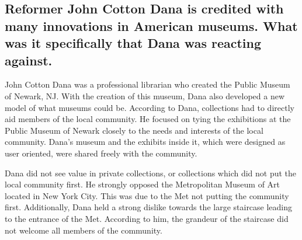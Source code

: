 \documentclass[11pt]{article}
\begin{document}
\begin{singlespacing}
\subsection*{Reformer John Cotton Dana is credited with many innovations in American museums. What was it specifically that Dana was reacting against.}
\end{singlespacing}

John Cotton Dana was a professional librarian who created the Public Museum of Newark, NJ. With the creation of this museum, Dana also developed a new model of what museums could be. According to Dana, collections had to directly aid members of the local community. He focused on tying the exhibitions at the Public Museum of Newark closely to the needs and interests of the local community. Dana's museum and the exhibits inside it, which were designed as user oriented, were shared freely with the community.

Dana did not see value in private collections, or collections which did not put the local community first. He strongly opposed the Metropolitan Museum of Art located in New York City. This was due to the Met not putting the community first. Additionally, Dana held a strong dislike towards the large staircase leading to the entrance of the Met. According to him, the grandeur of the staircase did not welcome all members of the community.
\end{document}
